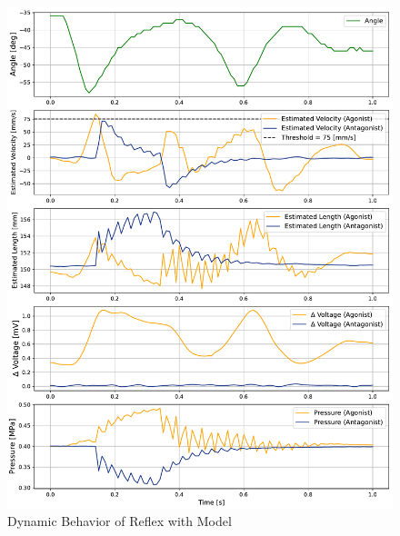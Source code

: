 \begin{figure}[t]
\begin{minipage}[H]{\textwidth}
\begin{minipage}[H]{0.48\textwidth}
            \includegraphics[width=\columnwidth]{fig/20240819_r20_reflex_all_plt.pdf}
            \caption{Dynamic Behavior of Reflex with Model}
            \label{fig:reflex_all}
        \end{minipage}
    \end{minipage}
\end{figure}
